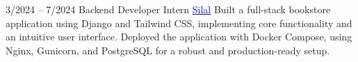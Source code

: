 \documentclass[9pt]{developercv} %
\begin{document}
\begin{entrylist}
    \entry
        {3/2024 -- 7/2024}
        {Backend Developer Intern}
        {{\href{https://www.silal.app/en}{\textcolor{blue}{Silal}}}}
        {
            {Built a full-stack bookstore application using Django and Tailwind CSS, implementing core functionality and an intuitive user interface. Deployed the application with Docker Compose, using Nginx, Gunicorn, and PostgreSQL for a robust and production-ready setup.}  
        }
\end{entrylist}
\end{document}

